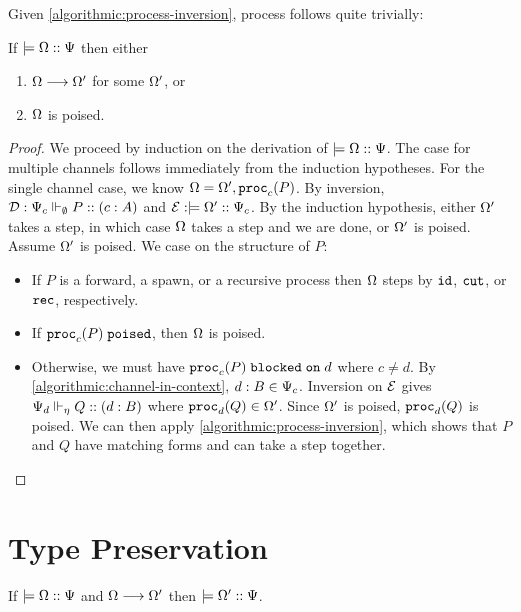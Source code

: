 Given \cref{algorithmic:process-inversion}, process follows quite trivially:

\begin{theorem}[Progress]
If $\models {\Omega} :: {\Psi}$ then either
\begin{enumerate}
  \item $\Omega \longrightarrow \Omega'$ for some $\Omega'$, or
  \item $\Omega$ is poised.
\end{enumerate}
\end{theorem}
\begin{proof}
  We proceed by induction on the derivation of $\models {\Omega} :: {\Psi}$. The case for multiple channels follows immediately from the induction hypotheses. For the single channel case, we know $\Omega = \Omega', \mathtt{proc}_{c}(P)$. By inversion, $\mathcal{D} : {\Psi_c} \Vdash_{\emptyset} P :: (c : A)$ and $\mathcal{E} : \models {\Omega'} :: {\Psi_c}$. By the induction hypothesis, either $\Omega'$ takes a step, in which case $\Omega$ takes a step and we are done, or $\Omega'$ is poised. Assume $\Omega'$ is poised. We case on the structure of $P$:
  \begin{itemize}
    \item If $P$ is a forward, a spawn, or a recursive process then $\Omega$ steps by $\texttt{id}$, $\texttt{cut}$, or $\texttt{rec}$, respectively.
    \item If $\mathtt{proc}_{c}(P)\;\mathtt{poised}$, then $\Omega$ is poised.
    \item Otherwise, we must have ${\mathtt{proc}_{c}(P)}\;\mathtt{blocked\;on}\;{d}$ where $c \neq d$. By \cref{algorithmic:channel-in-context}, $d : B \in \Psi_c$. Inversion on $\mathcal{E}$ gives ${\Psi_d} \Vdash_{\eta} Q :: (d : B)$ where $\mathtt{proc}_{d}(Q) \in \Omega'$. Since $\Omega'$ is poised, $\mathtt{proc}_{d}(Q)$ is poised. We can then apply \cref{algorithmic:process-inversion}, which shows that $P$ and $Q$ have matching forms and can take a step together.
  \end{itemize}
\end{proof}


\section{Type Preservation}

\begin{conjecture}[Preservation]
If $\models {\Omega} :: {\Psi}$ and $\Omega \longrightarrow \Omega'$ then $\models {\Omega'} :: {\Psi}$.
\end{conjecture}


